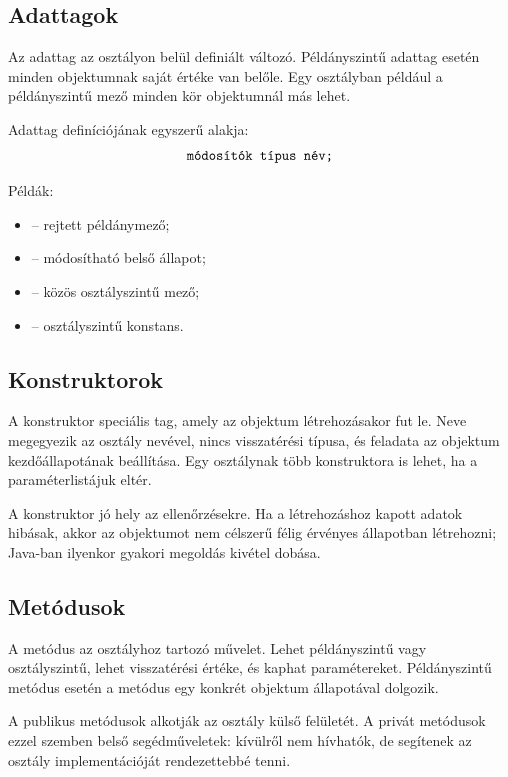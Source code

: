 \subsection{Adattagok}

Az adattag az osztályon belül definiált változó. Példányszintű adattag esetén minden objektumnak saját értéke van belőle. Egy  osztályban például a  példányszintű mező minden kör objektumnál más lehet.

Adattag definíciójának egyszerű alakja:
\[
  \texttt{módosítók típus név;}
\]

Példák:

\begin{itemize}
  \item {} -- rejtett példánymező;
  \item {} -- módosítható belső állapot;
  \item {} -- közös osztályszintű mező;
  \item {} -- osztályszintű konstans.
\end{itemize}

\subsection{Konstruktorok}

A konstruktor speciális tag, amely az objektum létrehozásakor fut le. Neve megegyezik az osztály nevével, nincs visszatérési típusa, és feladata az objektum kezdőállapotának beállítása. Egy osztálynak több konstruktora is lehet, ha a paraméterlistájuk eltér.

A konstruktor jó hely az ellenőrzésekre. Ha a létrehozáshoz kapott adatok hibásak, akkor az objektumot nem célszerű félig érvényes állapotban létrehozni; Java-ban ilyenkor gyakori megoldás kivétel dobása.

\subsection{Metódusok}

A metódus az osztályhoz tartozó művelet. Lehet példányszintű vagy osztályszintű, lehet visszatérési értéke, és kaphat paramétereket. Példányszintű metódus esetén a metódus egy konkrét objektum állapotával dolgozik.

A publikus metódusok alkotják az osztály külső felületét. A privát metódusok ezzel szemben belső segédműveletek: kívülről nem hívhatók, de segítenek az osztály implementációját rendezettebbé tenni.


